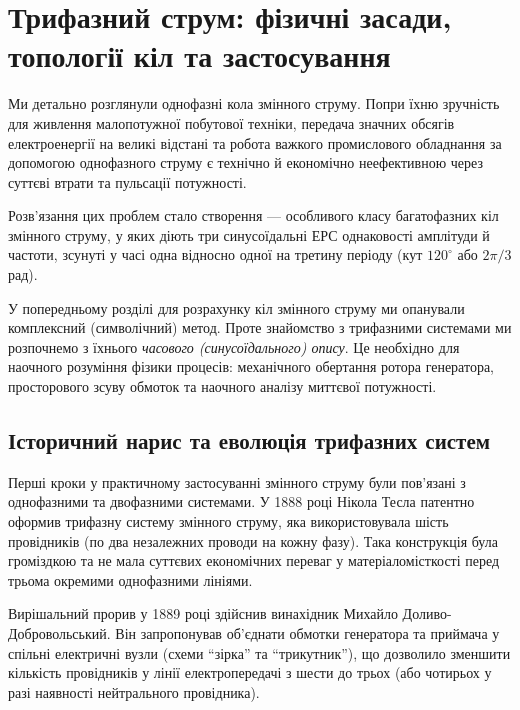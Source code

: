 \section{Трифазний струм: фізичні засади, топології кіл та застосування}\hypertarget{three-phase-current}{}

Ми детально розглянули однофазні кола змінного струму. Попри їхню зручність для живлення малопотужної побутової техніки, передача значних обсягів електроенергії на великі відстані та робота важкого промислового обладнання за допомогою однофазного струму є технічно й економічно неефективною через суттєві втрати та пульсації потужності.

Розв'язання цих проблем стало створення  --- особливого класу багатофазних кіл змінного струму, у яких діють три синусоїдальні ЕРС однаковості амплітуди й частоти, зсунуті у часі одна відносно одної на третину періоду (кут $120^\circ$ або $2\pi/3$ рад).

У попередньому розділі для розрахунку кіл змінного струму ми опанували комплексний (символічний) метод. Проте знайомство з трифазними системами ми розпочнемо з їхнього \emph{часового (синусоїдального) опису}.
%
Це необхідно для наочного розуміння фізики процесів: механічного обертання ротора генератора, просторового зсуву обмоток та наочного аналізу миттєвої потужності.


\subsection*{Історичний нарис та еволюція трифазних систем}

Перші кроки у практичному застосуванні змінного струму були пов'язані з однофазними та двофазними системами. У 1888 році Нікола Тесла патентно оформив трифазну систему змінного струму, яка використовувала шість провідників (по два незалежних проводи на кожну фазу). Така конструкція була громіздкою та не мала суттєвих економічних переваг у матеріаломісткості перед трьома окремими однофазними лініями.

Вирішальний прорив у 1889 році здійснив винахідник Михайло Доливо-Добровольський. Він запропонував об'єднати обмотки генератора та приймача у спільні електричні вузли (схеми \enquote{зірка} та \enquote{трикутник}), що дозволило зменшити кількість провідників у лінії електропередачі з шести до трьох (або чотирьох у разі наявності нейтрального провідника).

